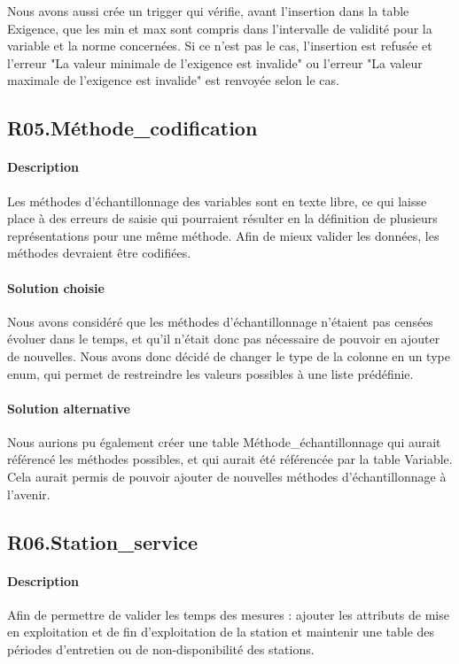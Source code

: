 \documentclass{article}
\begin{document}
Nous avons aussi crée un trigger qui vérifie, avant l'insertion dans la table Exigence,
que les min et max sont compris dans l'intervalle de validité pour la variable et la norme
concernées. Si ce n'est pas le cas, l'insertion est refusée et l'erreur "La valeur minimale de l'exigence est invalide"
ou l'erreur "La valeur maximale de l'exigence est invalide" est renvoyée selon le cas.

\subsection{R05.Méthode\_codification}
\paragraph{Description} Les méthodes d'échantillonnage des variables sont en texte libre, ce qui laisse place à des erreurs de saisie qui
pourraient résulter en la définition de plusieurs représentations pour une même méthode. Afin de mieux valider les données, les méthodes devraient être codifiées.

\paragraph{Solution choisie}
Nous avons considéré que les méthodes d'échantillonnage n'étaient pas censées
évoluer dans le temps, et qu'il n'était donc pas nécessaire de pouvoir
en ajouter de nouvelles. Nous avons donc décidé de changer le type de la
colonne en un type enum, qui permet de restreindre les valeurs possibles
à une liste prédéfinie.

\paragraph{Solution alternative}
Nous aurions pu également créer une table Méthode\_échantillonnage qui
aurait référencé les méthodes possibles, et qui aurait été référencée
par la table Variable. Cela aurait permis de pouvoir ajouter de nouvelles
méthodes d'échantillonnage à l'avenir.

\subsection{R06.Station\_service}
\paragraph{Description} Afin de permettre de valider les temps des mesures :
ajouter les attributs de mise en exploitation et de fin d'exploitation de la station et 
maintenir une table des périodes d'entretien ou de non-disponibilité des stations.
\end{document}
